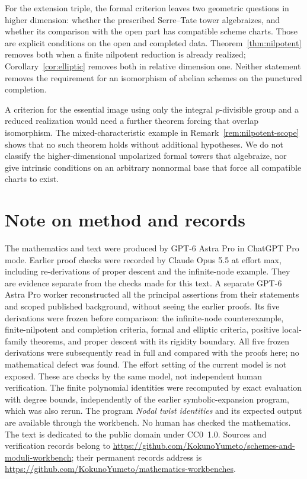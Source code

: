 \documentclass[11pt]{article}
\theoremstyle{definition}\newtheorem{definition}[theorem]{Definition}
\theoremstyle{remark}\newtheorem{remark}[theorem]{Remark}
\newcommand{\workbenchurl}{https://github.com/KokunoYumeto/schemes-and-moduli-workbench}
\newcommand{\recordurl}{https://github.com/KokunoYumeto/mathematics-workbenches}
\begin{document}
For the extension triple, the formal criterion leaves two geometric questions in higher dimension: whether the prescribed Serre--Tate tower algebraizes, and whether its comparison with the open part has compatible scheme charts. Those are explicit conditions on the open and completed data. Theorem~\ref{thm:nilpotent} removes both when a finite nilpotent reduction is already realized; Corollary~\ref{cor:elliptic} removes both in relative dimension one. Neither statement removes the requirement for an isomorphism of abelian schemes on the punctured completion.

A criterion for the essential image using only the integral $p$-divisible group and a reduced realization would need a further theorem forcing that overlap isomorphism. The mixed-characteristic example in Remark~\ref{rem:nilpotent-scope} shows that no such theorem holds without additional hypotheses. We do not classify the higher-dimensional unpolarized formal towers that algebraize, nor give intrinsic conditions on an arbitrary nonnormal base that force all compatible charts to exist.

\section*{Note on method and records}

The mathematics and text were produced by GPT-6 Astra Pro in ChatGPT Pro mode. Earlier proof checks were recorded by Claude Opus 5.5 at effort max, including re-derivations of proper descent and the infinite-node example. They are evidence separate from the checks made for this text. A separate GPT-6 Astra Pro worker reconstructed all the principal assertions from their statements and scoped published background, without seeing the earlier proofs. Its five derivations were frozen before comparison: the infinite-node counterexample, finite-nilpotent and completion criteria, formal and elliptic criteria, positive local-family theorems, and proper descent with its rigidity boundary. All five frozen derivations were subsequently read in full and compared with the proofs here; no mathematical defect was found. The effort setting of the current model is not exposed. These are checks by the same model, not independent human verification. The finite polynomial identities were recomputed by exact evaluation with degree bounds, independently of the earlier symbolic-expansion program, which was also rerun. The program \emph{Nodal twist identities} and its expected output are available through the workbench. No human has checked the mathematics. The text is dedicated to the public domain under CC0~1.0. Sources and verification records belong to \url{\workbenchurl}; their permanent records address is \url{\recordurl}.
\end{document}
